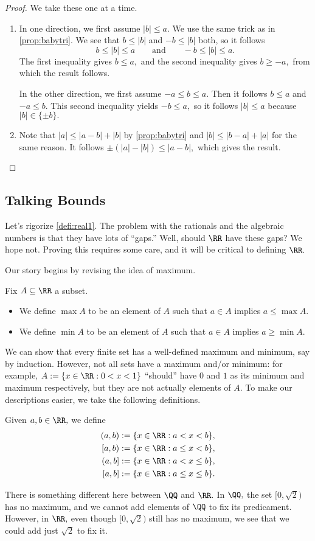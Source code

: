 \begin{proof}
	We take these one at a time.
	\begin{enumerate}[label=(\alph*)]
		\item In one direction, we first assume $|b|\le a.$ We use the same trick as in \autoref{prop:babytri}. We see that $b\le|b|$ and $-b\le|b|$ both, so it follows
		\[b\le|b|\le a\qquad\text{and}\qquad-b\le|b|\le a.\]
		The first inequality gives $b\le a,$ and the second inequality gives $b\ge-a,$ from which the result follows.
		
		In the other direction, we first assume $-a\le b\le a.$ Then it follows $b\le a$ and $-a\le b.$ This second inequality yields $-b\le a,$ so it follows $|b|\le a$ because $|b|\in\{\pm b\}.$
		\item Note that $|a|\le|a-b|+|b|$ by \autoref{prop:babytri} and $|b|\le|b-a|+|a|$ for the same reason. It follows $\pm(|a|-|b|)\le|a-b|,$ which gives the result.
		\qedhere
	\end{enumerate}
\end{proof}

\subsection{Talking Bounds}
Let's rigorize \autoref{defi:real1}. The problem with the rationals and the algebraic numbers is that they have lots of ``gaps.'' Well, should $\RR$ have these gaps? We hope not. Proving this requires some care, and it will be critical to defining $\RR.$

Our story begins by revising the idea of maximum.
\begin{defi}
	Fix $A\subseteq\RR$ a subset.
	\begin{itemize}
		\item We define $\max A$ to be an element of $A$ such that $a\in A$ implies $a\le\max A.$
		\item We define $\min A$ to be an element of $A$ such that $a\in A$ implies $a\ge\min A.$
	\end{itemize}
\end{defi}
We can show that every finite set has a well-defined maximum and minimum, say by induction. However, not all sets have a maximum and/or minimum: for example, $A:=\{x\in\RR:0<x<1\}$ ``should'' have $0$ and $1$ as its minimum and maximum respectively, but they are not actually elements of $A.$ To make our descriptions easier, we take the following definitions.
\begin{defi}
	Given $a,b\in\RR,$ we define
	\begin{align*}
		(a,b):=\{x\in\RR:a<x<b\}, \\
		[a,b):=\{x\in\RR:a\le x<b\}, \\
		(a,b]:=\{x\in\RR:a<x\le b\}, \\
		[a,b]:=\{x\in\RR:a\le x\le b\}.
	\end{align*}
\end{defi}
There is something different here between $\QQ$ and $\RR.$ In $\QQ,$ the set $[0,\sqrt2)$ has no maximum, and we cannot add elements of $\QQ$ to fix its predicament. However, in $\RR,$ even though $[0,\sqrt2)$ still has no maximum, we see that we could add just $\sqrt2$ to fix it.

